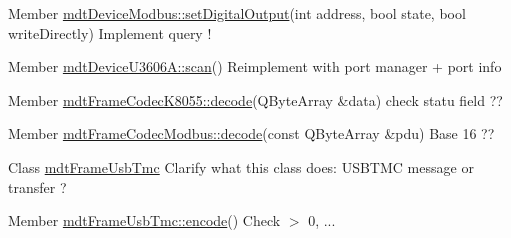\label{todo__todo000008}
\hypertarget{todo__todo000008}{}
 
\begin{DoxyDescription}
\item[Member \hyperlink{classmdt_device_modbus_a42f6d4b2729c8e421895c6810e4cadf8}{mdtDeviceModbus::setDigitalOutput}(int address, bool state, bool writeDirectly) ]Implement query ! 
\end{DoxyDescription}

\label{todo__todo000001}
\hypertarget{todo__todo000001}{}
 
\begin{DoxyDescription}
\item[Member \hyperlink{classmdt_device_u3606_a_a3a31558c573466fc1534b43e6ee7e327}{mdtDeviceU3606A::scan}() ]Reimplement with port manager + port info 
\end{DoxyDescription}

\label{todo__todo000054}
\hypertarget{todo__todo000054}{}
 
\begin{DoxyDescription}
\item[Member \hyperlink{classmdt_frame_codec_k8055_a9dfe60529b0e80d5bbd3852fdea51b18}{mdtFrameCodecK8055::decode}(QByteArray \&data) ]check statu field ?? 
\end{DoxyDescription}

\label{todo__todo000055}
\hypertarget{todo__todo000055}{}
 
\begin{DoxyDescription}
\item[Member \hyperlink{classmdt_frame_codec_modbus_a426f465363a49d70890a462b40677787}{mdtFrameCodecModbus::decode}(const QByteArray \&pdu) ]Base 16 ?? 
\end{DoxyDescription}

\label{todo__todo000059}
\hypertarget{todo__todo000059}{}
 
\begin{DoxyDescription}
\item[Class \hyperlink{classmdt_frame_usb_tmc}{mdtFrameUsbTmc} ]Clarify what this class does: USBTMC message or transfer ?
\end{DoxyDescription}

\label{todo__todo000058}
\hypertarget{todo__todo000058}{}
 
\begin{DoxyDescription}
\item[Member \hyperlink{classmdt_frame_usb_tmc_a9406dddfdd70f5dac729b2dbd728de77}{mdtFrameUsbTmc::encode}() ]Check $>$ 0, ... 
\end{DoxyDescription}

